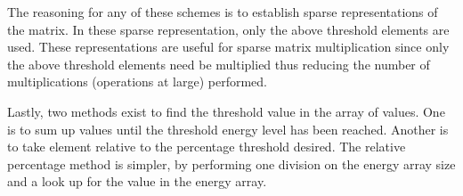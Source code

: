 The reasoning for any of these schemes is to establish sparse representations of the matrix.  In these sparse representation, only the above threshold elements are used.   These representations are useful for sparse matrix multiplication since only the above threshold elements need be multiplied thus reducing the number of multiplications (operations at large) performed.  









Lastly, two methods exist to find the threshold value in the array of values.  One is to sum up values until the threshold energy level has been reached.  Another is to take element relative to the percentage threshold desired.  The relative percentage method is simpler, by performing one division on the energy array size and a look up for the value in the energy array.  

